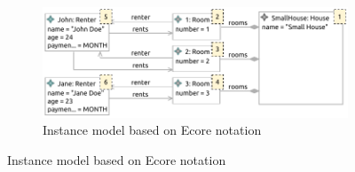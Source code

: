 \begin{figure}[p]
    \centering
    \begin{subfigure}{\textwidth}
        \centering
        \includegraphics{images/03_formalisations/02_ecore_formalisation/instance_model_example.pdf}
        \caption{Instance model based on Ecore notation}
    \end{subfigure}
    

\end{figure}
